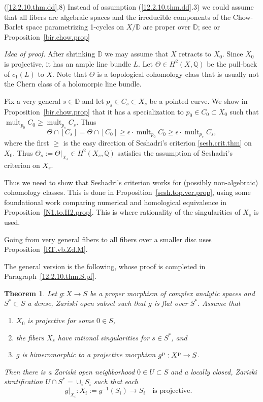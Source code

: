 \documentclass{amsart}
\newtheorem{thm}{Theorem}%
\theoremstyle{definition}
\theoremstyle{remark}
\newcommand{\dd}[0]{{\mathbb D}}
\newcommand{\q}[0]{{\mathbb Q}}
\newcommand{\qtq}[1]{\quad\mbox{#1}\quad}
\newcommand{\mult}[0]{\operatorname{mult}}
\begin{document}
(\ref{12.2.10.thm.dd}.8) Instead of assumption (\ref{12.2.10.thm.dd}.3) we could assume that all fibers are  algebraic spaces and the irreducible components of the Chow-Barlet space parametrizing  1-cycles on $X/\dd$ are proper over $\dd$; see \cite{bar-mag} or  Proposition~\ref{bir.chow.prop}


\medskip

{\it Idea of proof.} After shrinking $\dd$ we may assume that $X$ retracts to $X_0$. Since $X_0$ is projective,  it has an ample line bundle $L$.
Let  $\Theta\in H^2(X, \q)$ be the pull-back of
$c_1(L)$ to $X$.  Note that $\Theta$ is a topological cohomology class that is usually not the Chern class of a holomorpic line bundle.

Fix a very general $s\in \dd$ and let $p_s\in C_s\subset X_s$ be a pointed curve.
We show in Proposition~\ref{bir.chow.prop} that it has a specialization to $p_0\in C_0\subset X_0$ such that
$\mult_{p_0}C_0\geq \mult_{p_s}C_s$.  Thus
$$
  \Theta\cap [C_s]=\Theta\cap [C_0]
  \geq \epsilon\cdot \mult_{p_0}C_0\geq \epsilon\cdot\mult_{p_s}C_s,
  $$
  where the first $\geq $ is the easy direction of Seshadri's criterion \ref{sesh.crit.thm}  on $X_0$.  Thus $\Theta_s:=\Theta|_{X_s}\in H^2(X_s, \q)$ satisfies the assumption of 
  Seshadri's criterion on $X_s$.

  Thus we need to show that Seshadri's criterion works for (possibly non-algebraic) cohomology classes.  This is done in Proposition~\ref{sesh.top.ver.prop}, using some foundational work comparing numerical and homological equivalence in Proposition~\ref{N1.to.H2.prop}. This is where rationality of the singularities of $X_s$ is used.

  Going from very general fibers to all fibers over a smaller disc  uses Proposition~\ref{RT.vb.Zd.M}.
  
  \medskip

The general version is the following, whose proof is  completed  in Paragraph~\ref{12.2.10.thm.S.pf}.


\begin{thm} \label{12.2.10.thm.S}
  Let $g:X\to S$ be a  proper morphism of complex analytic spaces and
  $S^*\subset S$ a dense, Zariski open subset such that $g$ is flat over $S^*$. 
Assume that
\begin{enumerate}
  \item $X_0$ is projective for some $0\in S$,
\item the fibers $X_s$ have rational singularities for $s\in S^*$, and
\item $g$ is bimeromorphic to a projective morphism $g^{\rm p}:X^{\rm p}\to S$.
\end{enumerate}
Then there is a Zariski  open neighborhood
$0\in U\subset S$ and a locally closed, Zariski stratification
$U\cap S^*=\cup_i S_i$ such that each
$$
g|_{X_i}:X_i:=g^{-1}(S_i)\to S_i \qtq{is projective.}
$$
\end{thm}
\end{document}

